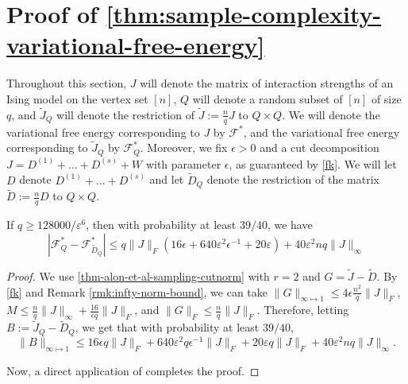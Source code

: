 \documentclass[final, 12pt]{colt2018}
\newcommand{\F}{\mathcal{F}}
\theoremstyle{definition}
\theoremstyle{plain}
\begin{document}
\section{Proof of \cref{thm:sample-complexity-variational-free-energy}}
Throughout this section, $J$ will denote the matrix of interaction strengths of an Ising model on the vertex set $[n]$, $Q$ will denote a random subset of $[n]$ of size $q$, and $\tilde{J}_Q$ will denote the restriction of $\tilde{J}:=\frac{n}{q}J$ to $Q \times Q$. We will denote the variational free energy corresponding to $J$ by $\F^*$, and the variational free energy corresponding to $\tilde{J}_Q$ by $\F^*_Q$. 
Moreover, we fix $\epsilon >0$ and a cut decomposition $J = D^{(1)} + \dots + D^{(s)} + W$ with parameter $\epsilon$, as guaranteed by \cref{fk}. We will let $D$ denote $D^{(1)} + \dots + D^{(s)}$ and let $\tilde{D}_Q$ denote the restriction of the matrix $\tilde{D}:=\frac{n}{q}D$ to $Q \times Q$. 
\begin{lemma}
\label{lemma:alon-et-al-application}
If $q \geq 128000/\varepsilon^{6}$, then with probability at least $39/40$, we have 
$$\left|\F^*_Q - \F^*_{\tilde{D}_Q}\right| \leq q\|J\|_{F} \left(16\epsilon + 640\varepsilon^{2}\epsilon^{-1} + 20\varepsilon \right) + 40\varepsilon^{2}nq \|J\|_{\infty} $$
\end{lemma}
\begin{proof}
We use \cref{thm-alon-et-al-sampling-cutnorm} with $r=2$ and $G = \tilde{J}-\tilde{D}$. By \cref{fk} and Remark \ref{rmk:infty-norm-bound}, we can take $\|G\|_{\infty\mapsto 1} \leq 4 \epsilon \frac{n^2}{q} \|J\|_{F} $, $M \leq \frac{n}{q}\|J\|_{\infty} + \frac{16}{\epsilon q}\|J\|_{F}$, and $\|G\|_{F} \leq \frac{n}{q} \|J\|_{F}$. Therefore, letting $B:=\tilde{J}_Q - \tilde{D}_Q$, we get that with probability at least $39/40$, 
$$\|B\|_{\infty \mapsto 1} \leq 16\epsilon q \|J\|_{F} +640\varepsilon^{2}q \epsilon^{-1} \|J\|_{F} + 20\varepsilon q \|J\|_{F} + 40\varepsilon^{2}nq \|J\|_{\infty}.$$

Now, a direct application of  completes the proof. 
\end{proof}
\end{document}
